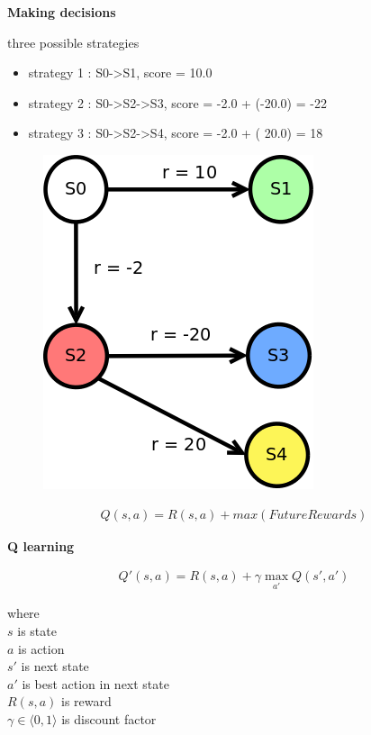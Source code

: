 \documentclass[xcolor=dvipsnames]{beamer}
\begin{document}
\begin{frame}{\bf Making decisions}

three possible strategies
\begin{itemize}
  \item strategy 1 : S0->S1, score = 10.0
  \item strategy 2 : S0->S2->S3, score = -2.0 + (-20.0) = -22
  \item strategy 3 : S0->S2->S4, score = -2.0 + ( 20.0) =  18
\end{itemize}

  \begin{figure}
    \includegraphics[scale=0.22]{../../diagrams/rl_trap.png}
  \end{figure}

  \begin{align*}
    Q(s, a) = R(s, a) + max(FutureRewards)
  \end{align*}

\end{frame}


\begin{frame}{\bf Q learning}

\begin{align*}
Q'(s, a) = R(s, a) + \gamma \max \limits_{a'} Q(s', a')
\end{align*}

where \\
$s$ is state \\
$a$ is action \\
$s'$ is next state \\
$a'$ is best action in next state \\
$R(s, a)$ is reward \\
$\gamma \in \langle 0, 1 \rangle$ is discount factor \\

\end{frame}
\end{document}
